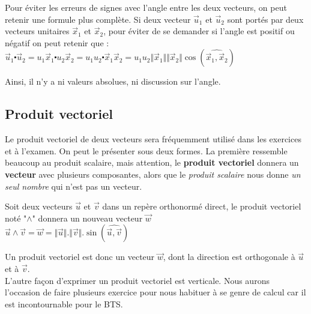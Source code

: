 \documentclass[
	11pt, %
	fleqn, %
	a4paper, %
]{LegrandOrangeBook}
\begin{document}
Pour éviter les erreurs de signes avec l'angle entre les deux vecteurs, on peut retenir une formule plus complète.
Si deux vecteur $\Vec{u}_1$ et $\Vec{u}_2$ sont portés par deux vecteurs unitaires $\Vec{x}_1$ et $\Vec{x}_2$, pour éviter de se demander si l'angle est positif ou négatif on peut retenir que : \\
$\Vec{u}_1 \centerdot \Vec{u}_2 = u_1 \Vec{x}_1 \centerdot u_2 \Vec{x}_2 =  u_1 u_2 \centerdot \Vec{x}_1 \Vec{x}_2 = u_1 u_2 \Vert \Vec{x}_1 \Vert \Vert \Vec{x}_2 \Vert \cos ( \widehat{\Vec{x}_1, \Vec{x}_2} ) $

Ainsi, il n’y a ni valeurs absolues, ni discussion sur l’angle.




\subsection{Produit vectoriel}\label{Produit vectoriel}
Le produit vectoriel de deux vecteurs sera fréquemment utilisé dans les exercices et à l'examen. On peut le présenter sous deux formes. La première ressemble beaucoup au produit scalaire, mais attention, le \textbf{produit vectoriel} donnera un \textbf{vecteur} avec plusieurs composantes, alors que le \textit{produit scalaire} nous donne \textit{un seul nombre} qui n'est pas un vecteur.

\begin{definition}
    Soit deux vecteurs $\vec{u}$ et $\Vec{v}$ dans un repère orthonormé direct, le produit vectoriel noté "$\land$" donnera un nouveau vecteur $\vec{w}$ \\
    $\vec{u} \land \vec{v} = \vec{w} = \Vert \vec{u} \Vert . \Vert \vec{v} \Vert . \sin ( \widehat{\Vec{u}, \Vec{v}} )$
\end{definition}

Un produit vectoriel est donc un vecteur $\vec{w}$, dont la direction est orthogonale à $\vec{u}$ et à $\Vec{v}$. \\

L'autre façon d'exprimer un produit vectoriel est verticale. Nous aurons l'occasion de faire plusieurs exercice pour nous habituer à se genre de calcul car il est incontournable pour le BTS.
\end{document}
